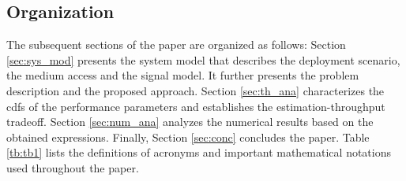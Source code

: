 \subsection{Organization}
The subsequent sections of the paper are organized as follows: Section \ref{sec:sys_mod} presents the system model that describes the deployment scenario, the medium access and the signal model. It further presents the problem description and the proposed approach. Section \ref{sec:th_ana} characterizes the cdfs of the performance parameters and establishes the estimation-throughput tradeoff. Section \ref{sec:num_ana} analyzes the numerical results based on the obtained expressions. Finally, Section \ref{sec:conc} concludes the paper. Table \ref{tb:tb1} lists the definitions of acronyms and important mathematical notations used throughout the paper.


